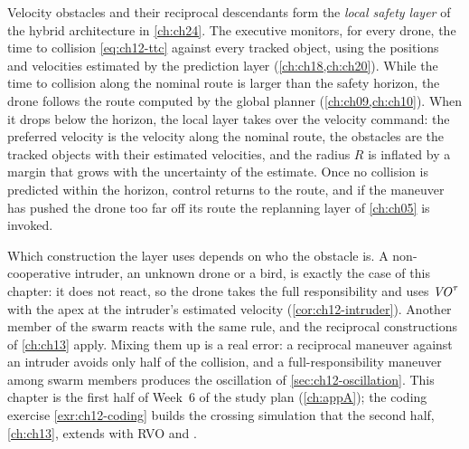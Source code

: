 \begin{dronebox}
Velocity obstacles and their reciprocal descendants form the \emph{local
safety layer} of the hybrid architecture in \cref{ch:ch24}. The executive
monitors, for every drone, the time to collision \cref{eq:ch12-ttc} against
every tracked object, using the positions and velocities estimated by the
prediction layer (\cref{ch:ch18,ch:ch20}). While the time to collision along
the nominal route is larger than the safety horizon, the drone follows the
route computed by the global planner (\cref{ch:ch09,ch:ch10}). When it drops
below the horizon, the local layer takes over the velocity command: the
preferred velocity is the velocity along the nominal route, the obstacles are
the tracked objects with their estimated velocities, and the radius $R$ is
inflated by a margin that grows with the uncertainty of the estimate. Once no
collision is predicted within the horizon, control returns to the route, and
if the maneuver has pushed the drone too far off its route the replanning
layer of \cref{ch:ch05} is invoked.

Which construction the layer uses depends on who the obstacle is. A
non-cooperative intruder, an unknown drone or a bird, is exactly the case of
this chapter: it does not react, so the drone takes the full responsibility
and uses $\mathit{VO}^{\tau}$ with the apex at the intruder's estimated velocity
(\cref{cor:ch12-intruder}). Another member of the swarm reacts with the same
rule, and the reciprocal constructions of \cref{ch:ch13} apply. Mixing them
up is a real error: a reciprocal maneuver against an intruder avoids only half
of the collision, and a full-responsibility maneuver among swarm members
produces the oscillation of \cref{sec:ch12-oscillation}. This chapter is the
first half of Week~6 of the study plan (\cref{ch:appA}); the coding exercise
\cref{exr:ch12-coding} builds the crossing simulation that the second half,
\cref{ch:ch13}, extends with RVO and \orca.
\end{dronebox}

